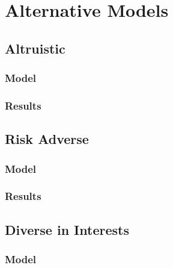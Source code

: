 \documentclass[acmlarge]{acmart}
\begin{document}

\section{Alternative Models}

\subsection{Altruistic}
\subsubsection{Model}
\subsubsection{Results}

\subsection{Risk Adverse}
\subsubsection{Model}
\subsubsection{Results}

\subsection{Diverse in Interests}
\subsubsection{Model}
\end{document}
